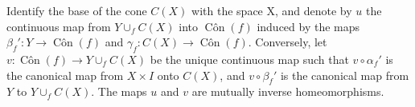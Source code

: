 Identify the base of the cone \(C(X)\) with the space X, and denote by \(u\) the continuous map from \(Y \cup_f C(X)\) into \(\operatorname{Côn}(f)\) induced by the maps \(\beta_f':Y\to\operatorname{Côn}(f)\) and \(\gamma_f:C(X)\to\operatorname{Côn}(f)\). Conversely, let \(v:\operatorname{Côn}(f)\to Y\cup_f C(X)\) be the unique continuous map such that \(v\circ\alpha_f'\) is the canonical map from \(X\times I\) onto \(C(X)\), and \(v\circ\beta_f'\) is the canonical map from \(Y\) to \(Y\cup_f C(X)\). The maps \(u\) and \(v\) are mutually inverse homeomorphisms.


